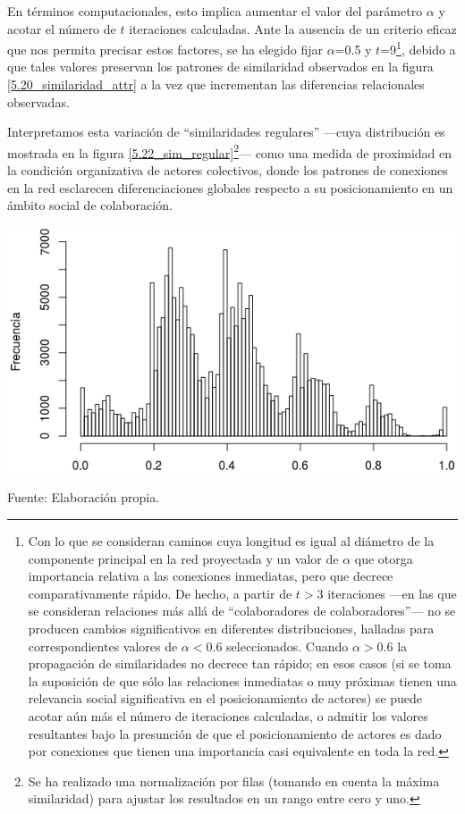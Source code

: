 \documentclass[letterpaper, 11pt]{book}
\theoremstyle{definition}
\theoremstyle{remark}
\begin{document}
En términos computacionales, esto implica aumentar el valor del parámetro $\alpha$ y acotar el número de $t$ iteraciones calculadas. 
Ante la ausencia de un criterio eficaz que nos permita precisar estos factores, se ha elegido fijar $\alpha$=0.5 y $t$=9\footnote{
    Con lo que se consideran caminos cuya longitud es igual al diámetro de la componente principal en la red proyectada y un valor de $\alpha$ que otorga importancia relativa a las conexiones inmediatas, pero que decrece comparativamente rápido. 
    De hecho, a partir de $t>3$ iteraciones ---en las que se consideran relaciones más allá de ``colaboradores de colaboradores''--- no se producen cambios significativos en diferentes distribuciones, halladas para correspondientes valores de $\alpha < 0.6$ seleccionados. 
    Cuando $\alpha>0.6$ la propagación de similaridades no decrece tan rápido; en esos casos (si se toma la suposición de que sólo las relaciones inmediatas o muy próximas tienen una relevancia social significativa en el posicionamiento de actores) se puede acotar aún más el número de iteraciones calculadas, o admitir los valores resultantes bajo la presunción de que el posicionamiento de actores es dado por conexiones que tienen una importancia casi equivalente en toda la red. 
}, 
debido a que tales valores preservan los patrones de similaridad observados en la figura \ref{5.20_similaridad_attr} a la vez que incrementan las diferencias relacionales observadas. 

Interpretamos esta variación de ``similaridades regulares'' ---cuya distribución es mostrada en la figura \ref{5.22_sim_regular}\footnote{
    Se ha realizado una normalización por filas (tomando en cuenta la máxima similaridad) para ajustar los resultados en un rango entre cero y uno.
}--- como una medida de proximidad en la condición organizativa de actores colectivos, donde los patrones de conexiones en la red esclarecen diferenciaciones globales respecto a su posicionamiento en un ámbito social de colaboración. 


\hspace{-1em}\begin{minipage}{\linewidth}
\centering
{} \label{5.22_sim_regular}
\includegraphics[scale=0.68]{img/5.22_sim_regular.png}
\par\bigskip
\small Fuente: Elaboración propia. 
\end{minipage}\bigskip
\end{document}

